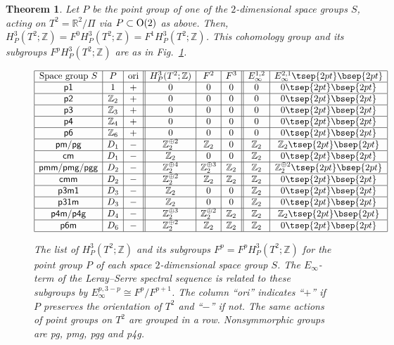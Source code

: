 \documentclass[pdftex]{sigma}
\newtheorem{thm}{Theorem}[section]
\theoremstyle{definition}
\newcommand{\R}{\mathbb{R}}
\newcommand{\Z}{\mathbb{Z}}
\begin{document}
\begin{thm} \label{thm:main}
Let $P$ be the point group of one of the $2$-dimensional space groups $S$, acting on $T^2 = \R^2/\Pi$ via $P \subset {\rm O}(2)$ as above. Then,
$H^3_{P}(T^2; \Z) = F^0H^3_P(T^2; \Z) = F^1H^3_P(T^2; \Z)$. This cohomology group and its subgroups $F^pH^3_P(T^2; \Z)$ are as in Fig.~{\rm \ref{fig:list}}.
\begin{figure}[htpb]
$$
\begin{array}{|c|c|c||c|c|c||c|c|}
\hline
\mbox{Space group $S$} & P & \mbox{ori} &
H^3_P(T^2; \Z) & F^2 & F^3 &
E^{1,2}_\infty & E^{2,1}_\infty \tsep{2pt}\bsep{2pt}\\
\hline
\mbox{\textsf{p1}} & 1 & + & 0 & 0 & 0 &
0 & 0 \tsep{2pt}\bsep{2pt}\\
\hline
\mbox{\textsf{p2}} & \Z_2 & + & 0 & 0 & 0 &
0 & 0 \tsep{2pt}\bsep{2pt}\\
\hline
\mbox{\textsf{p3}} & \Z_3 & + & 0 & 0 & 0 &
0 & 0 \tsep{2pt}\bsep{2pt}\\
\hline
\mbox{\textsf{p4}} & \Z_4 & + & 0 & 0 & 0 &
0 & 0 \tsep{2pt}\bsep{2pt}\\
\hline
\mbox{\textsf{p6}} & \Z_6 & + & 0 & 0 & 0 &
0 & 0 \tsep{2pt}\bsep{2pt}\\
\hline
\mbox{\textsf{pm}/\textsf{pg}} & D_1 & - & \Z_2^{\oplus 2} & \Z_2 & 0 &
\Z_2 & \Z_2 \tsep{2pt}\bsep{2pt}\\
\hline
\mbox{\textsf{cm}} & D_1 & - & \Z_2 & 0 & 0 &
\Z_2 & 0 \tsep{2pt}\bsep{2pt}\\
\hline
\mbox{\textsf{pmm}/\textsf{pmg}/\textsf{pgg}} & D_2 & - &
\Z_2^{\oplus 4} & \Z_2^{\oplus 3} & \Z_2 &
\Z_2 & \Z_2^{\oplus 2} \tsep{2pt}\bsep{2pt}\\
\hline
\mbox{\textsf{cmm}} & D_2 & - & \Z_2^{\oplus 2} & \Z_2 & \Z_2 &
\Z_2 & 0 \tsep{2pt}\bsep{2pt}\\
\hline
\mbox{\textsf{p3m1}} & D_3 & - & \Z_2 & 0 & 0 &
\Z_2 & 0 \tsep{2pt}\bsep{2pt}\\
\hline
\mbox{\textsf{p31m}} & D_3 & - & \Z_2 & 0 & 0 &
\Z_2 & 0 \tsep{2pt}\bsep{2pt}\\
\hline
\mbox{\textsf{p4m}/\textsf{p4g}} & D_4 & - &
\Z_2^{\oplus 3} & \Z_2^{\oplus 2} & \Z_2 &
\Z_2 & \Z_2 \tsep{2pt}\bsep{2pt}\\
\hline
\mbox{\textsf{p6m}} & D_6 & - & \Z_2^{\oplus 2} & \Z_2 & \Z_2 &
\Z_2 & 0 \tsep{2pt}\bsep{2pt}\\
\hline
\end{array}
$$
\caption{The list of $H^3_P(T^2; \Z)$ and its subgroups $F^p = F^pH^3_P(T^2; \Z)$ for the point group $P$ of each space $2$-dimensional space group $S$. The $E_\infty$-term of the Leray--Serre spectral sequence is related to these subgroups by $E^{p, 3-p}_\infty \cong F^p/F^{p+1}$. The column ``ori'' indicates ``$+$'' if $P$ preserves the orientation of $T^2$ and ``$-$'' if not. The same actions of point groups on $T^2$ are grouped in a row. Nonsymmorphic groups are \textsf{pg}, \textsf{pmg}, \textsf{pgg} and \textsf{p4g}.
}
\label{fig:list}
\end{figure}
\end{thm}
\end{document}
